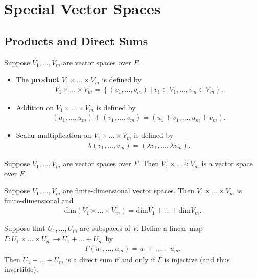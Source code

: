 \documentclass{memoir}
\begin{document}
\chapter{Special Vector Spaces}
\label{cha:products_and_quotients_of_vector_spaces}

\section{Products and Direct Sums}
\begin{defn}
	Suppose $V_1,\ldots,V_m$ are vector spaces over $F$.
	\begin{itemize}
		\item The \textbf{product} $V_1\times \ldots \times V_m$ is defined by
			\begin{align*}
				V_1 \times \ldots \times V_m = \left\{(v_1,\ldots,v_m) \mid v_1 \in V_1,\ldots,v_m \in V_m \right\} .
			\end{align*}
	\item Addition on $V_1\times \ldots \times V_m$ is defined by
		\begin{align*}
			(u_1,\ldots,u_m) + (v_1,\ldots,v_m) = (u_1+v_1,\ldots,u_m+v_m).
		\end{align*}
	\item Scalar multiplication on $V_1\times \ldots \times V_m$ is defined by
		\begin{align*}
			 \lambda(v_1,\ldots,v_m) = (\lambda v_1,\ldots, \lambda v_m).
		\end{align*}
	\end{itemize}
\end{defn}
\begin{lemma}
	Suppose $V_1,\ldots,V_m$ are vector spaces over $F$. Then $V_1\times \ldots \times V_m$ is a vector space over $F$.
\end{lemma}
\begin{lemma}
	Suppose $V_1,\ldots,V_m$ are finite-dimensional vector spaces. Then $V_1 \times \ldots \times V_m$ is finite-dimensional and
	\begin{align*}
		\textrm{dim}(V_1\times \ldots\times V_m) = \textrm{dim}V_1 + \ldots + \textrm{dim}V_m .
	\end{align*}
\end{lemma}
\begin{lemma}
	Suppose that $U_1,\ldots,U_m$ are subspaces of $V$. Define a linear map $\Gamma: U_1\times \ldots\times U_m \to U_1+\ldots+U_m$ by
	\begin{align*}
		\Gamma(u_1,\ldots,u_m) = u_1+\ldots+u_m.
	\end{align*}
	Then $U_1 + \ldots + U_m$ is a direct sum if and only if $\Gamma$ is injective (and thus invertible).
\end{lemma}
\end{document}
